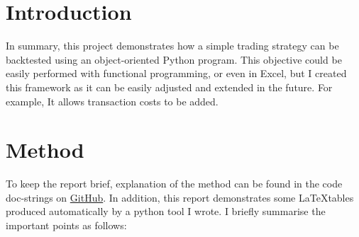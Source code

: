\documentclass[12pt, oneside, a4paper]{article}
\begin{document}








\restoregeometry

\setcounter{page}{4}
\setcounter{figure}{0}

\pagestyle{fancy}


\pagebreak




\section{Introduction}

In summary, this project demonstrates how a simple trading strategy can be backtested using an object-oriented Python program. This objective could be easily performed with functional programming, or even in Excel, but I created this framework as it can be easily adjusted and extended in the future. For example, It allows transaction costs to be added.

\section{Method}

To keep the report brief, explanation of the method can be found in the code doc-strings on \href{https://github.com/kelvinbrinham/StrategyBacktest}{\color{highlight} GitHub}. In addition, this report demonstrates some \LaTeX tables produced automatically by a python tool I wrote. I briefly summarise the important points as follows:
\end{document}
